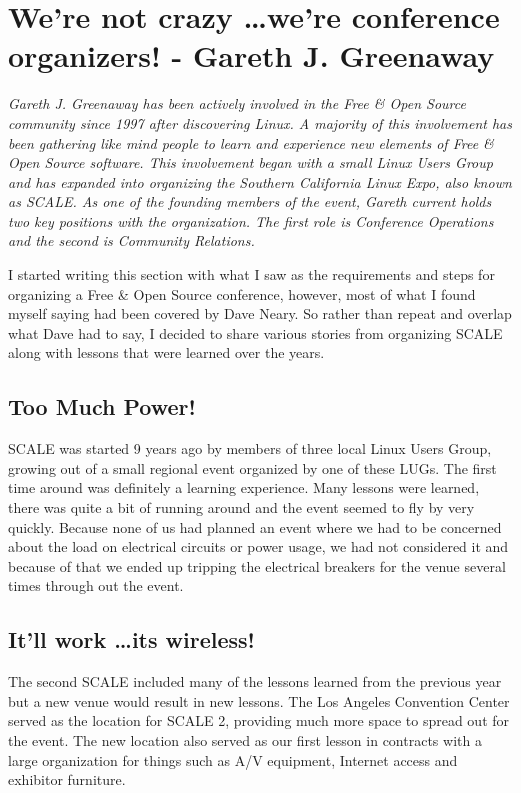 \chapter{We're not crazy \dots we're conference organizers! - Gareth J.
Greenaway}

\textit{Gareth J. Greenaway has been actively involved in the Free \& Open Source
community since 1997 after discovering Linux. A majority of this involvement has
been gathering like mind people to learn and experience new elements of Free \&
Open Source software. This involvement began with a small Linux Users Group and
has expanded into organizing the Southern California Linux Expo, also known as
SCALE. As one of the founding members of the event, Gareth current holds two key
positions with the organization. The first role is Conference Operations and the
second is Community Relations.}

I started writing this section with what I saw as the requirements and steps for
organizing a Free \& Open Source conference, however, most of what I found myself
saying had been covered by Dave Neary. So rather than repeat and overlap what
Dave had to say, I decided to share various stories from organizing SCALE along
with lessons that were learned over the years.

\section*{Too Much Power!}

SCALE was started 9 years ago by members of three local Linux Users Group,
growing out of a small regional event organized by one of these LUGs. The first
time around was definitely a learning experience. Many lessons were learned,
there was quite a bit of running around and the event seemed to fly by very
quickly. Because none of us had planned an event where we had to be
concerned about the load on electrical circuits or power usage, we had not
considered it and because of that we ended up tripping the electrical breakers
for the venue several times through out the event.

\section*{It’ll work \dots its wireless!}

The second SCALE included many of the lessons learned from the previous year but
a new venue would result in new lessons. The Los Angeles Convention Center
served as the location for SCALE 2, providing much more space to spread out for
the event. The new location also served as our first lesson in contracts with a
large organization for things such as A/V equipment, Internet access and
exhibitor furniture.  

